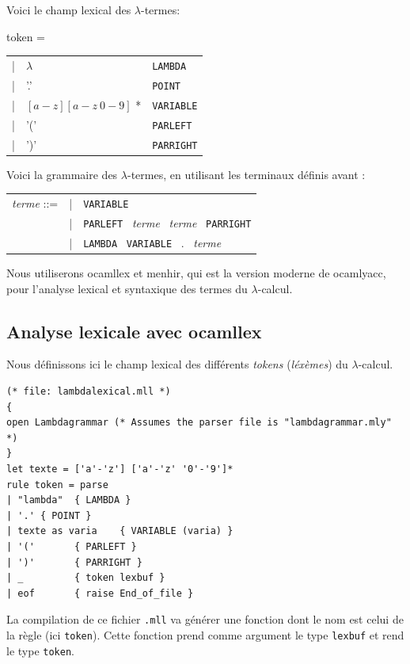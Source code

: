 \documentclass[11pt]{book}
\begin{document}
Voici le champ lexical des $\lambda $-termes:

\vspace{0.2cm}
token = \begin{tabular}{lll}
| & $\lambda$  & 	{ \verb+LAMBDA+ } \\
| & '.' &  { \verb+POINT+ } \\
| & $[ a-z ] [ a-z\  0-9 ]$ * & { \verb+VARIABLE+ } \\
| & '('	 &	{ \verb+PARLEFT+ } \\
| & ')'	 &	{ \verb+PARRIGHT+ }
\end{tabular}
\vspace{0.4cm}

Voici la grammaire des $\lambda $-termes, en utilisant les terminaux définis
avant :

\vspace{0.2cm}
\begin{tabular}{lll}
\textit{terme} ::= & | & \verb+VARIABLE+  \\
& | & \verb+PARLEFT+ \ \textit{terme} \ \textit{terme} \ \verb+PARRIGHT+ \\
& |& \verb+LAMBDA+ \ \verb+VARIABLE+ \  . \ \textit{terme}
\end{tabular}
\vspace{0.2cm}

Nous utiliserons ocamllex et menhir, qui est la version moderne de ocamlyacc, pour l'analyse lexical et syntaxique des termes
du $\lambda $-calcul.

\subsection{Analyse lexicale avec ocamllex}
Nous d\'{e}finissons ici le champ lexical des diff\'{e}rents \textit{tokens}  (\textit{l\'{e}x\`{e}mes}) du
$\lambda$-calcul.


\begin{Verbatim}
(* file: lambdalexical.mll *)
{
open Lambdagrammar (* Assumes the parser file is "lambdagrammar.mly" *)
}
let texte = ['a'-'z'] ['a'-'z' '0'-'9']*
rule token = parse
| "lambda"	{ LAMBDA }
| '.' { POINT }
| texte as varia	{ VARIABLE (varia) }
| '('		{ PARLEFT }
| ')'		{ PARRIGHT }
| _			{ token lexbuf }
| eof		{ raise End_of_file }
\end{Verbatim}

La compilation de ce fichier \verb+.mll+ va générer une fonction dont le nom
est celui de la règle (ici \verb+token+).
Cette fonction prend comme argument le type \verb+lexbuf+ et rend le type \verb+token+. 
\end{document}
